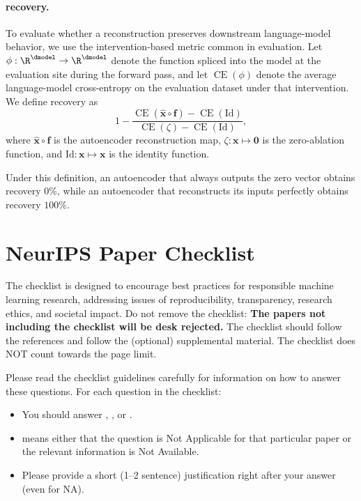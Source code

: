 \documentclass{article}
\begin{document}
\paragraph{ recovery.}
To evaluate whether a reconstruction preserves downstream language-model behavior, we use the intervention-based metric common in  evaluation. Let $\phi : \R^{\dmodel} \to \R^{\dmodel}$ denote the function spliced into the model at the evaluation site during the forward pass, and let $\operatorname{CE}(\phi)$ denote the average language-model cross-entropy on the evaluation dataset under that intervention. We define  recovery as
\begin{equation}
  \label{eq:ce-recovery}
  1 - \frac{\operatorname{CE}(\hat{\mathbf{x}} \circ \mathbf{f}) - \operatorname{CE}(\mathrm{Id})}{\operatorname{CE}(\zeta) - \operatorname{CE}(\mathrm{Id})},
\end{equation}
where $\hat{\mathbf{x}} \circ \mathbf{f}$ is the autoencoder reconstruction map, $\zeta : \mathbf{x} \mapsto \mathbf{0}$ is the zero-ablation function, and $\mathrm{Id} : \mathbf{x} \mapsto \mathbf{x}$ is the identity function.

Under this definition, an autoencoder that always outputs the zero vector obtains  recovery $0\%$, while an autoencoder that reconstructs its inputs perfectly obtains  recovery $100\%$.







\newpage
\section*{NeurIPS Paper Checklist}

The checklist is designed to encourage best practices for responsible machine learning research, addressing issues of reproducibility, transparency, research ethics, and societal impact. Do not remove the checklist: {\bf The papers not including the checklist will be desk rejected.} The checklist should follow the references and follow the (optional) supplemental material.  The checklist does NOT count towards the page
limit. 

Please read the checklist guidelines carefully for information on how to answer these questions. For each question in the checklist:
\begin{itemize}
    \item You should answer \answerYes{}, \answerNo{}, or \answerNA{}.
    \item \answerNA{} means either that the question is Not Applicable for that particular paper or the relevant information is Not Available.
    \item Please provide a short (1–2 sentence) justification right after your answer (even for NA). 
\end{itemize}
\end{document}
